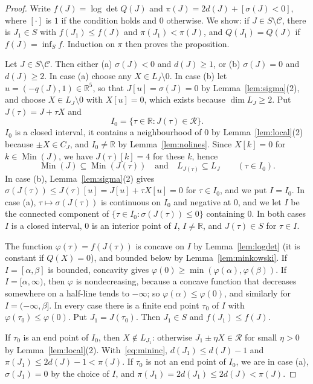 \documentclass[11pt]{amsart}
\theoremstyle{definition}
\theoremstyle{remark}
\numberwithin{equation}{section}
\numberwithin{table}{section}
\numberwithin{figure}{section}
\newcommand{\R}{\mathbb{R}}
\newcommand{\Rk}{\mathcal{R}}
\newcommand{\Min}{\operatorname{Min}}
\newcommand{\cand}{\mathcal{C}}
\begin{document}
\begin{proof}
Write $f(J)=\log\det Q(J)$ and $\pi(J)=2d(J)+[\sigma(J)<0]$, where $[\cdot]$ is $1$ if the condition holds and $0$ otherwise. We show: if $J\in S\setminus\cand$, there is $J_1\in S$ with $f(J_1)\le f(J)$ and $\pi(J_1)<\pi(J)$, and $Q(J_1)=Q(J)$ if $f(J)=\inf_Sf$. Induction on $\pi$ then proves the proposition.

Let $J\in S\setminus\cand$. Then either (a) $\sigma(J)<0$ and $d(J)\ge1$, or (b) $\sigma(J)=0$ and $d(J)\ge2$. In case (a) choose any $X\in L_J\setminus0$. In case (b) let $u=(-q(J),1)\in\R^5$, so that $J[u]=\sigma(J)=0$ by Lemma~\ref{lem:sigma}(2), and choose $X\in L_J\setminus0$ with $X[u]=0$, which exists because $\dim L_J\ge2$. Put $J(\tau)=J+\tau X$ and
\[
I_0=\{\tau\in\R:J(\tau)\in\Rk\}.
\]
$I_0$ is a closed interval, it contains a neighbourhood of $0$ by Lemma~\ref{lem:local}(2) because $\pm X\in C_J$, and $I_0\ne\R$ by Lemma~\ref{lem:nolines}. Since $X[k]=0$ for $k\in\Min(J)$, we have $J(\tau)[k]=4$ for these $k$, hence
\begin{equation}\label{eq:mininc}
\Min(J)\subseteq\Min(J(\tau))\quad\text{and}\quad L_{J(\tau)}\subseteq L_J\qquad(\tau\in I_0).
\end{equation}
In case (b), Lemma~\ref{lem:sigma}(2) gives $\sigma(J(\tau))\le J(\tau)[u]=J[u]+\tau X[u]=0$ for $\tau\in I_0$, and we put $I=I_0$. In case (a), $\tau\mapsto\sigma(J(\tau))$ is continuous on $I_0$ and negative at $0$, and we let $I$ be the connected component of $\{\tau\in I_0:\sigma(J(\tau))\le0\}$ containing $0$. In both cases $I$ is a closed interval, $0$ is an interior point of $I$, $I\ne\R$, and $J(\tau)\in S$ for $\tau\in I$.

The function $\varphi(\tau)=f(J(\tau))$ is concave on $I$ by Lemma~\ref{lem:logdet} (it is constant if $Q(X)=0$), and bounded below by Lemma~\ref{lem:minkowski}. If $I=[\alpha,\beta]$ is bounded, concavity gives $\varphi(0)\ge\min(\varphi(\alpha),\varphi(\beta))$. If $I=[\alpha,\infty)$, then $\varphi$ is nondecreasing, because a concave function that decreases somewhere on a half-line tends to $-\infty$; so $\varphi(\alpha)\le\varphi(0)$, and similarly for $I=(-\infty,\beta]$. In every case there is a finite end point $\tau_0$ of $I$ with $\varphi(\tau_0)\le\varphi(0)$. Put $J_1=J(\tau_0)$. Then $J_1\in S$ and $f(J_1)\le f(J)$.

If $\tau_0$ is an end point of $I_0$, then $X\notin L_{J_1}$: otherwise $J_1\pm\eta X\in\Rk$ for small $\eta>0$ by Lemma~\ref{lem:local}(2). With~\eqref{eq:mininc}, $d(J_1)\le d(J)-1$ and $\pi(J_1)\le2d(J)-1<\pi(J)$. If $\tau_0$ is not an end point of $I_0$, we are in case (a), $\sigma(J_1)=0$ by the choice of $I$, and $\pi(J_1)=2d(J_1)\le2d(J)<\pi(J)$.


\end{proof}
\end{document}
